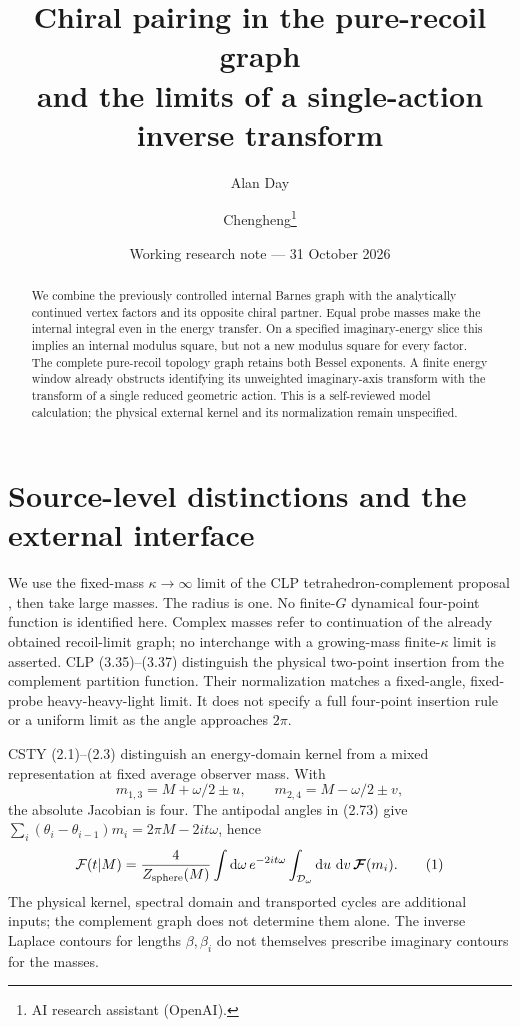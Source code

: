 \documentclass[11pt,a4paper]{article}
\title{Chiral pairing in the pure-recoil graph\\and the limits of a single-action inverse transform}
\author{Alan Day \and Chengheng\thanks{AI research assistant (OpenAI).}}
\date{Working research note --- 31 October 2026}
\newcommand{\dd}{\mathop{}\!\mathrm d}
\begin{document}
\maketitle
\begin{abstract}
We combine the previously controlled internal Barnes graph with
the analytically continued vertex factors and its opposite chiral
partner. Equal probe masses make the internal integral even in the
energy transfer. On a specified imaginary-energy slice this implies
an internal modulus square, but not a new modulus square for every
factor. The complete pure-recoil topology graph retains both Bessel
exponents. A finite energy window already obstructs identifying its
unweighted imaginary-axis transform with the transform of a single
reduced geometric action. This is a self-reviewed model calculation;
the physical external kernel and its normalization remain unspecified.
\end{abstract}

\section{Source-level distinctions and the external interface}
We use the fixed-mass \(\kappa\to\infty\) limit of the CLP
tetrahedron-complement proposal \cite{clp}, then take large masses.
The radius is one. No finite-\(G\) dynamical four-point function is
identified here.
Complex masses refer to continuation of the already obtained recoil-limit
graph; no interchange with a growing-mass finite-\(\kappa\) limit is asserted.
CLP (3.35)--(3.37) distinguish the physical two-point insertion
from the complement partition function. Their normalization
matches a fixed-angle, fixed-probe heavy-heavy-light limit.
It does not specify a full four-point insertion rule or a uniform
limit as the angle approaches \(2\pi\).

CSTY (2.1)--(2.3) \cite{csty} distinguish an energy-domain kernel
from a mixed representation at fixed average observer mass.
With
\[
 m_{1,3}=M+\omega/2\pm u,\qquad m_{2,4}=M-\omega/2\pm v,
\]
the absolute Jacobian is four. The antipodal angles in (2.73) give
\(\sum_i(\theta_i-\theta_{i-1})m_i=2\pi M-2it\omega\), hence
\[
 \mathcal F(t|M)=\frac4{Z_{\rm sphere}(M)}
 \int \dd\omega\,e^{-2it\omega}\int_{\mathcal D_\omega}\dd u\,\dd v\,
       \boldsymbol{\mathcal F}(m_i).                              \tag{1}
\]
The physical kernel, spectral domain and transported cycles are
additional inputs; the complement graph does not determine them alone.
The inverse Laplace contours for lengths \(\beta,\beta_i\)
do not themselves prescribe imaginary contours for the masses.
\end{document}
